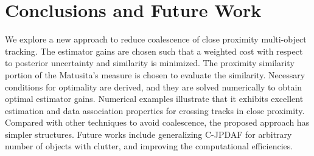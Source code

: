 \documentclass[letterpaper, 10pt, conference]{ieeeconf}
\begin{document}


\section{Conclusions and Future Work}
\label{ConclusionFutureWork}
We explore a new approach to reduce coalescence of close proximity multi-object tracking. The estimator gains are chosen such that a weighted cost with respect to posterior uncertainty and similarity is minimized. The proximity similarity portion of the Matusita's measure is chosen to evaluate the similarity. Necessary conditions for optimality are derived, and they are solved numerically to obtain optimal estimator gains. Numerical examples illustrate that it exhibits excellent estimation and data association properties for crossing tracks in close proximity. Compared with other techniques to avoid coalescence, the proposed approach has simpler structures. Future works include generalizing C-JPDAF for arbitrary number of objects with clutter, and improving the computational efficiencies. 

\end{document}
